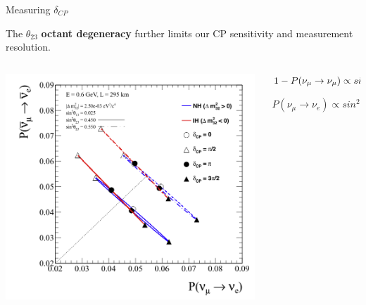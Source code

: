 %
%
\begin{frame}{Measuring $\delta_{CP}$}

The $\theta_{23}$ {\bf octant degeneracy} further limits our CP sensitivity
and measurement resolution.

\begin{columns}
  \begin{column}{0.65\textwidth}
    \begin{center}
       \includegraphics[width=0.99\textwidth]{./images/biprob/biprob_t2k_matter_non_maximal}
    \end{center}
  \end{column}
  \begin{column}{0.35\textwidth}
  {\small
   \begin{center}
       $1 - P(\nu_{\mu}\rightarrow\nu_{\mu}) \propto sin^{2}{\color{magenta}2}\theta_{23}$
   \end{center}
   \vspace{0.2cm}
   \begin{center}
       $P(\nu_{\mu}\rightarrow\nu_{e}) \propto sin^{2}\theta_{23}$
   \end{center}
  }
  \end{column}
\end{columns}

\end{frame}

